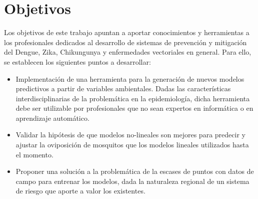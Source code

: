 \section{Objetivos}

  \par Los objetivos de este trabajo apuntan a aportar conocimientos y
    herramientas a los profesionales dedicados al desarrollo de sistemas de
    prevención y mitigación del Dengue, Zika, Chikungunya y enfermedades
    vectoriales en general. Para ello, se establecen los siguientes puntos
    a desarrollar:
    \begin{itemize}
      \item Implementación de una herramienta para la generación de nuevos modelos
        predictivos a partir de variables ambientales. Dadas las
        características interdisciplinarias de la
        problemática en la epidemiología, dicha herramienta
        debe ser utilizable por profesionales que no sean expertos en
        informática o en aprendizaje automático.
      \item Validar la hipótesis de que modelos no-lineales son mejores
        para predecir y ajustar la oviposición de mosquitos que los modelos
        lineales utilizados hasta el momento.
      \item Proponer una solución a la problemática de la
        escases de puntos con datos de campo para entrenar los modelos,
        dada la naturaleza regional de un sistema de riesgo que aporte a
        valor los existentes.
    \end{itemize}

%
